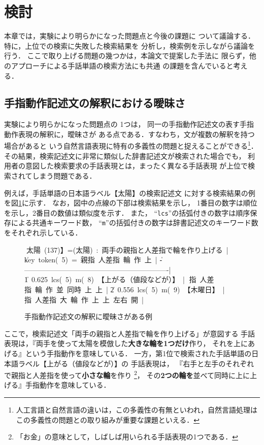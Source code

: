 \section {検討}

本章では，実験により明らかになった問題点と今後の課題に
ついて議論する．特に，上位での検索に失敗した検索結果を
分析し，検索例を示しながら議論を行う．
ここで取り上げる問題の幾つかは，本論文で提案した手法に
限らず，他のアプローチによる手話単語の検索方法にも共通
の課題を含んでいると考える．

\subsection {手指動作記述文の解釈における曖昧さ}

実験により明らかになった問題点の 1つは，
同一の手指動作記述文の表す手指動作表現の解釈に，曖昧さが
ある点である．すなわち，文が複数の解釈を持つ場合があると
いう自然言語表現に特有の多義性の問題と捉えることができる\footnote{
人工言語と自然言語の違いは，この多義性の有無といわれ，自然言語処理はこの多義性の問題との取り組みが重要な課題といえる．}．
その結果，検索記述文に非常に類似した辞書記述文が検索された場合でも，
利用者の意図した検索要求の手話表現とは，まったく異なる手話表現
が上位で検索されてしまう問題である．

例えば，手話単語の日本語ラベル【太陽】の検索記述文
に対する検索結果の例を図\ref{fig:ambiguity}に示す．
なお，図中の点線の下部は検索結果を示し，
1番目の数字は順位を示し，2番目の数値は類似度を示す．
また，
``{\tt lcs}''の括弧付きの数字は順序保存による共通キーワード数，
``{\tt m}''の括弧付きの数字は辞書記述文のキーワード数をそれぞれ示している．

\begin{figure}[tb]
\vbox{\footnotesize\tabcolsep=3pt
\hbox{\|【太陽 (137)】=(太陽) : 両手の親指と人差指で輪を作り上げる |}
\hbox{\| key token( 5) = 親指 人差指 輪 作 上                         |}
\hbox{\|--------------------------------------------------------------|}
\hbox{\| 1 0.625 lcs( 5) m( 8) 【上がる（値段などが）】   |}
\hbox{\|                        親指 人差指 輪 作 並  同時 上 上 |}
\hbox{\| 2 0.556 lcs( 5) m( 9) 【木曜日】                 |}
\hbox{\|                        親指 人差指 大 輪 作 上 上 左右 開 |}
}
\centerline{}
\caption{手指動作記述文の解釈に曖昧さがある例}
\label{fig:ambiguity}
\end{figure}

ここで，検索記述文「両手の親指と人差指で輪を作り上げる」が意図する
手話表現は，『両手を使って太陽を模倣した{\bf 大きな輪を1つだけ}作り，
それを上にあげる』という手指動作を意味している．
一方，第1位で検索された手話単語の日本語ラベル【上がる（値段などが）】の
手話表現は，
『右手と左手のそれぞれで親指と人差指を使って{\bf 小さな輪}を作り
\footnote{「お金」の意味として，しばしば用いられる手話表現の1つである．}，
その{\bf 2つの輪を}並べて同時に上に上げる』手指動作を意味している．

